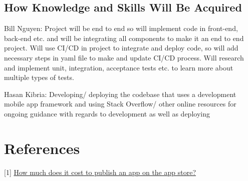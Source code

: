 \documentclass[12pt,letterpaper]{article}
\begin{document}
\subsection{How Knowledge and Skills Will Be Acquired}
\noindent Bill Nguyen: Project will be end to end so will implement code in front-end, back-end etc. and will be integrating all components to make it an end to end project. Will use CI/CD in project to integrate and deploy code, so will add necessary steps in yaml file to make and update CI/CD process. Will research and implement unit, integration, acceptance tests etc. to learn more about multiple types of tests.

\noindent Hasan Kibria: Developing/ deploying the codebase that uses a development mobile app framework and using Stack Overflow/ other online resources for ongoing guidance with regards to development as well as deploying

\newpage 

\section{References}
[1] \href{https://www.appypie.com/faqs/how-much-does-it-cost-to-publish-an-app-on-the-app-store}{\color{blue}How much does it cost to publish an app on the app store?}
\end{document}
